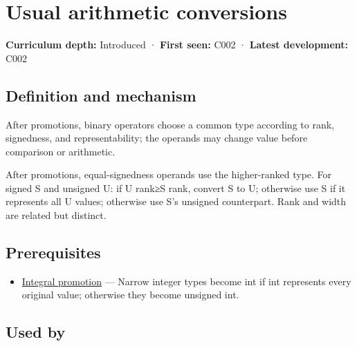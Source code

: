 \hypertarget{appendix-5e2d663adf7f}{}\label{referencestart:appendix-5e2d663adf7f}
\section{Usual arithmetic conversions}\label{appendix-5e2d663adf7f-usual-arithmetic-conversions}

\hypertarget{appendix-5e2d663adf7f-usual-arithmetic-conversions}{}

\textbf{Curriculum depth:} Introduced · \textbf{First seen:} C002 · \textbf{Latest development:} C002

\begin{allmightroledefinition}

\subsection{Definition and mechanism}\label{appendix-5e2d663adf7f-definition-and-mechanism}

\hypertarget{appendix-5e2d663adf7f-definition-and-mechanism}{}

After promotions, binary operators choose a common type according to rank, signedness, and representability; the operands may change value before comparison or arithmetic.

\end{allmightroledefinition}

After promotions, equal-signedness operands use the higher-ranked type. For signed S and unsigned U: if U rank≥S rank, convert S to U; otherwise use S if it represents all U values; otherwise use S's unsigned counterpart. Rank and width are related but distinct.

\subsection{Prerequisites}\label{appendix-5e2d663adf7f-prerequisites}

\hypertarget{appendix-5e2d663adf7f-prerequisites}{}

\begin{itemize}
\tightlist
\item
  \hyperref[appendix-45303d03796a]{Integral promotion} --- Narrow integer types become int if int represents every original value; otherwise they become unsigned int.
\end{itemize}

\subsection{Used by}\label{appendix-5e2d663adf7f-used-by}


